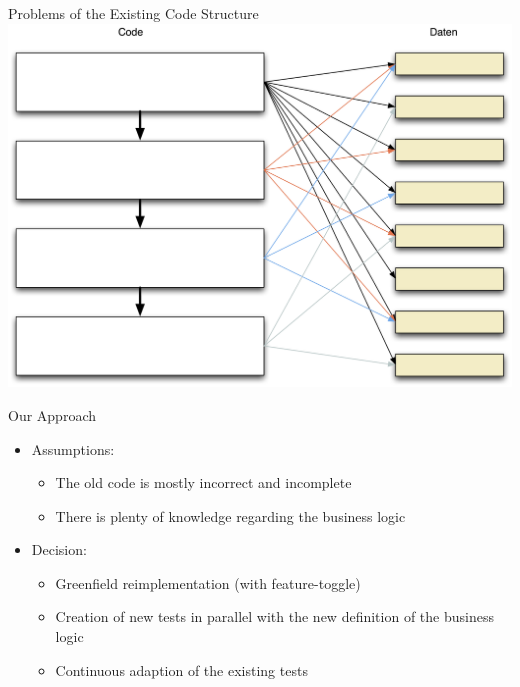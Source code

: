 \begin{frame}[fragile]{Problems of the Existing Code Structure}
\includegraphics[width=.85 \paperwidth]{Codestruktur.png}
\end{frame}

\begin{frame}[fragile]{Our Approach}
\begin{itemize}
\item Assumptions:
\begin{itemize}
\item The old code is mostly incorrect and incomplete
\item There is plenty of knowledge regarding the business logic
\end{itemize}
\end{itemize}

\begin{itemize}
\item Decision:
\begin{itemize}
\item Greenfield reimplementation (with feature-toggle)
\item Creation of new tests in parallel with the new definition of the business logic
\item Continuous adaption of the existing tests
\end{itemize}
\end{itemize}

\end{frame}


